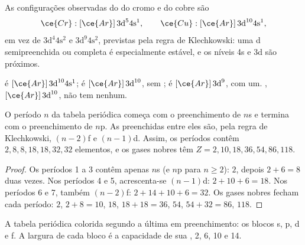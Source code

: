\begin{proposition}\label{prop:b1:quantum-numbers:exceptions}
As configurações observadas do  do cromo e do cobre são
\[
  \ce{Cr}: [\ce{Ar}]\,3\text{d}^5 4\text{s}^1, \qquad
  \ce{Cu}: [\ce{Ar}]\,3\text{d}^{10} 4\text{s}^1 ,
\]
em vez de $3\text{d}^4 4\text{s}^2$ e $3\text{d}^9 4\text{s}^2$,
previstas pela regra de Klechkowski: uma  d semipreenchida ou
completa é especialmente estável, e os níveis 4s e 3d são próximos.
\end{proposition}

\begin{example}\label{ex:b1:quantum-numbers:copper}
 é $[\ce{Ar}]\,3\text{d}^{10} 4\text{s}^1$;  é
$[\ce{Ar}]\,3\text{d}^{10}$, sem ;  é
$[\ce{Ar}]\,3\text{d}^9$, com um. , $[\ce{Ar}]\,3\text{d}^{10}$,
não tem nenhum.
\end{example}

\begin{proposition}\label{prop:b1:quantum-numbers:table}
O período $n$ da tabela periódica começa com o preenchimento de $n$s e
termina com o preenchimento de $n$p. As  preenchidas entre eles
são, pela regra de Klechkowski, $(n-2)$f e $(n-1)$d. Assim, os períodos
contêm $2, 8, 8, 18, 18, 32, 32$ elementos, e os gases nobres têm $Z = 2, 10,
18, 36, 54, 86, 118$.
\end{proposition}

\begin{proof}
Os períodos 1 a 3 contêm apenas $n$s (e $n$p para $n \ge 2$): $2$, depois
$2 + 6 = 8$ duas vezes. Nos períodos 4 e 5, acrescenta-se $(n-1)$d: $2 + 10 + 6 =
18$. Nos períodos 6 e 7, também $(n-2)$f: $2 + 14 + 10 + 6 = 32$. Os
gases nobres fecham cada período: $2$, $2 + 8 = 10$, $18$, $18 + 18 = 36$,
$54$, $54 + 32 = 86$, $118$.
\end{proof}

\begin{omfigure}
\omperiodictable[colour=blocks, legend]

{\small A tabela periódica colorida segundo a última  em
preenchimento: os blocos s, p, d e f. A largura de cada bloco é a
capacidade de sua , 2, 6, 10 e 14.}
\end{omfigure}

